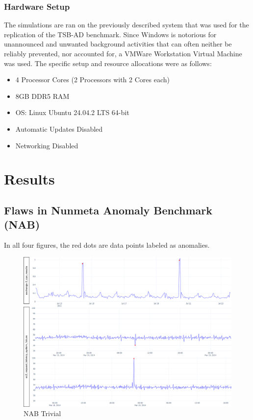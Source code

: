 \documentclass[12pt,oneside]{article}
\begin{document}
\subsubsection{Hardware Setup}

The simulations are ran on the previously described system that was used for the replication of the TSB-AD benchmark. Since Windows is notorious for unannounced and unwanted background activities that can often neither be reliably prevented, nor accounted for, a VMWare Workstation Virtual Machine was used. The specific setup and resource allocations were as follows:

\begin{itemize}
    \item 4 Processor Cores (2 Processors with 2 Cores each)
    \item 8GB DDR5 RAM
    \item OS: Linux Ubuntu 24.04.2 LTS 64-bit
    \item Automatic Updates Disabled
    \item Networking Disabled
\end{itemize}

\section{Results}

\subsection{Flaws in Nunmeta Anomaly Benchmark (NAB)} \label{nab_res}

In all four figures, the red dots are data points labeled as anomalies. 

\begin{figure}[htbp] 
    \centering 
    \includegraphics[width=\textwidth]{trivial.png}
    \caption{NAB Trivial}
    \label{fig:trivial}
\end{figure}
\end{document}
